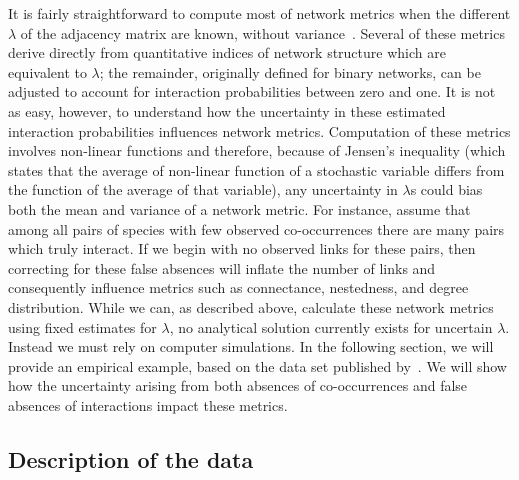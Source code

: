 \documentclass[12pt]{article}
\begin{document}
    It is fairly straightforward to compute most of network metrics when the different $\lambda$ of the adjacency matrix are known, without variance~\citep{Poisot2016}. Several of these metrics derive directly from quantitative indices of network structure which are equivalent to $\lambda$; the remainder, originally defined for binary networks, can be adjusted to account for interaction probabilities between zero and one. It is not as easy, however, to understand how the uncertainty in these estimated interaction probabilities influences network metrics. Computation of these metrics involves non-linear functions and therefore, because of Jensen's inequality (which states that the average of non-linear function of a stochastic variable differs from the function of the average of that variable), any uncertainty in $\lambda$s could bias both the mean and variance of a network metric. For instance, assume that among all pairs of species with few observed co-occurrences there are many pairs which truly interact. If we begin with no observed links for these pairs, then correcting for these false absences will inflate the number of links and consequently influence metrics such as connectance, nestedness, and degree distribution. While we can, as described above, calculate these network metrics using fixed estimates for $\lambda$, no analytical solution currently exists for uncertain $\lambda$. Instead we must rely on computer simulations. In the following section, we will provide an empirical example, based on the data set published by~\citet{Kopelke2017}. We will show how the uncertainty arising from both absences of co-occurrences and false absences of interactions impact these metrics. %


    \subsection*{Description of the data}
\end{document}
